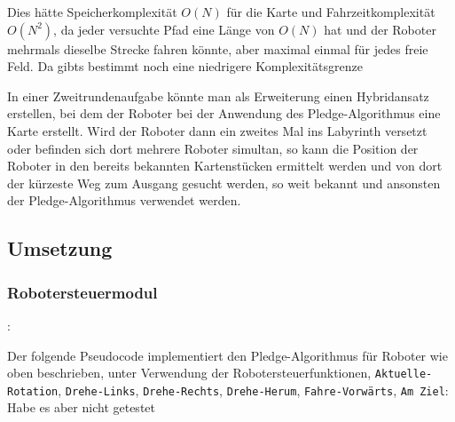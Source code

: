 \documentclass[10pt,a4paper]{article}
\newcommand{\notsure}[1]{{\color{red} #1}}
\begin{document}
Dies hätte Speicherkomplexität $O(N)$ für die Karte und Fahrzeitkomplexität $O(N^2)$, da jeder versuchte Pfad eine Länge von $O(N)$ hat und der Roboter mehrmals dieselbe Strecke fahren könnte, aber maximal einmal für jedes freie Feld. \notsure{Da gibts bestimmt noch eine niedrigere Komplexitätsgrenze} %
 
\vspace{0.5cm}
 
In einer Zweitrundenaufgabe könnte man als Erweiterung einen Hybridansatz erstellen, bei dem der Roboter bei der Anwendung des Pledge-Algorithmus eine Karte erstellt. Wird der Roboter dann ein zweites Mal ins Labyrinth versetzt oder  befinden sich dort mehrere Roboter simultan, so kann die Position der Roboter in den bereits bekannten Kartenstücken ermittelt werden und von dort der kürzeste Weg zum Ausgang gesucht werden, so weit bekannt und ansonsten der Pledge-Algorithmus verwendet werden.
  
\subsection{Umsetzung}


\newcommand{\RobotRotation}{\texttt{Aktuelle-Rotation}}
\newcommand{\RobotTurnLeft}{\texttt{Drehe-Links}}
\newcommand{\RobotTurnRight}{\texttt{Drehe-Rechts}}
\newcommand{\RobotTurnAround}{\texttt{Drehe-Herum}}
\newcommand{\RobotMoveForward}{\texttt{Fahre-Vorwärts}}
\newcommand{\RobotWon}{\texttt{Am Ziel}}


\subsubsection{Robotersteuermodul}:

Der folgende Pseudocode implementiert den Pledge-Algorithmus für Roboter wie oben beschrieben, unter Verwendung der Robotersteuerfunktionen, \RobotRotation, \RobotTurnLeft, \RobotTurnRight, \RobotTurnAround, \RobotMoveForward, \RobotWon: \notsure{Habe es aber nicht getestet}
\end{document}
